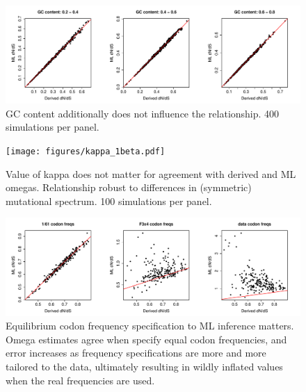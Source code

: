 \documentclass[11pt]{article}
\begin{document}
	
\newpage

	


\bigskip

\begin{figure}[H]
\centerline{\includegraphics[width=6in]{figures/gc_2beta.pdf}}
\caption{\label{gc} GC content additionally does not influence the relationship. 400 simulations per panel.}
\end{figure}

\begin{figure}[H]
\centerline{\texttt{[image: figures/kappa\_1beta.pdf]}}
\caption{\label{kappa} Value of kappa does not matter for agreement with derived and ML omegas. Relationship robust to differences in (symmetric) mutational spectrum. 100 simulations per panel.}
\end{figure}

\begin{figure}[H]
\centerline{\includegraphics[width=6in]{figures/freqspec_1beta.pdf}}
\caption{\label{freqspec_compare} Equilibrium codon frequency specification to ML inference matters. Omega estimates agree when specify equal codon frequencies, and error increases as frequency specifications are more and more tailored to the data, ultimately resulting in wildly inflated values when the real frequencies are used.}
\end{figure}
\end{document}
